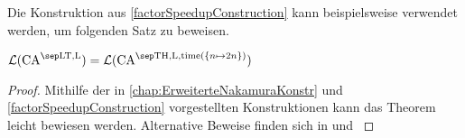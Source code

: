 Die Konstruktion aus \cref{factorSpeedupConstruction} kann beispielsweise verwendet werden, um folgenden Satz zu beweisen.

\begin{theorem}
    \label{linSpeedup}
    $\CAL{\CALT, \CALeft} = \CAL{\CAT, \CALeft, \mathrm{time}(\finset{ n \mapsto 2n }) }$
\end{theorem}
\begin{proof}
    Mithilfe der in \cref{chap:ErweiterteNakamuraKonstr} und \cref{factorSpeedupConstruction} vorgestellten Konstruktionen kann das Theorem leicht bewiesen werden.
    Alternative Beweise finden sich in \cite{MAZOYER199259} und \cite{IBARRA1988225}
\end{proof}

